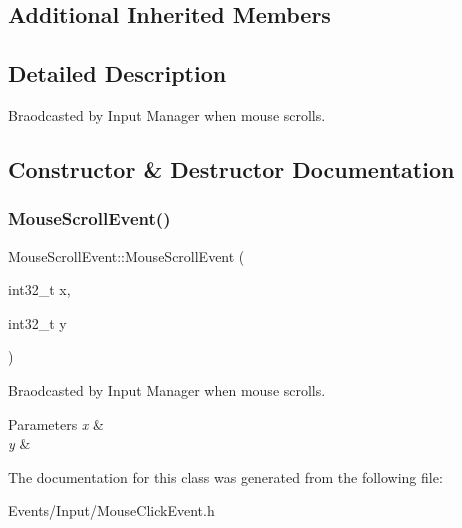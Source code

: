 \subsection*{Additional Inherited Members}


\subsection{Detailed Description}
Braodcasted by Input Manager when mouse scrolls. 

\subsection{Constructor \& Destructor Documentation}
\mbox{\label{classMouseScrollEvent_a69075c1ddb225629b22f2429e935f055}} 
\subsubsection{\texorpdfstring{Mouse\+Scroll\+Event()}{MouseScrollEvent()}}
{\footnotesize\ttfamily Mouse\+Scroll\+Event\+::\+Mouse\+Scroll\+Event (\begin{DoxyParamCaption}\item[{int32\+\_\+t}]{x,  }\item[{int32\+\_\+t}]{y }\end{DoxyParamCaption})\hspace{0.3cm}{\ttfamily [inline]}}



Braodcasted by Input Manager when mouse scrolls. 


\begin{DoxyParams}{Parameters}
{\em x} & \\
\hline
{\em y} & \\
\hline
\end{DoxyParams}


The documentation for this class was generated from the following file\+:\begin{DoxyCompactItemize}
\item 
Events/\+Input/Mouse\+Click\+Event.\+h\end{DoxyCompactItemize}
